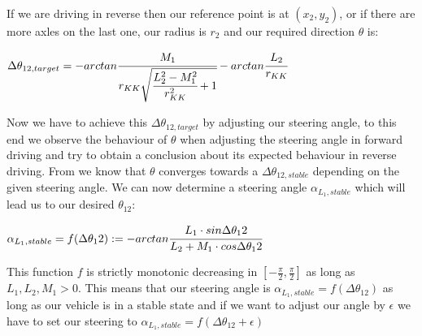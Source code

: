 If we are driving in reverse then our reference point is at $(x_2,y_2)$, or if there are more axles on the last one, our radius is $r_2$ and our required direction $\theta$ is:

\begin{center}
$\Delta \theta_{12,target}=-arctan \cfrac{M_1}{r_{KK} \sqrt{\cfrac{L_2^2-M^2_1}{r^2_{KK}}+1}}-arctan \cfrac{L_2}{r_{KK}}$
\end{center}

Now we have to achieve this $\Delta \theta_{12,target}$ by adjusting our steering angle, to this end we observe the behaviour of $\theta$ when adjusting the steering angle in forward driving and try to obtain a conclusion about its expected behaviour in reverse driving. From \cite{12} we know that $\theta$ converges towards a $\Delta \theta_{12,stable}$ depending on the given steering angle. We can now determine a steering angle $\alpha_{L_1,stable}$ which will lead us to our desired $\theta_12$:

\begin{center}
$\alpha_{L_1,stable}=f(\Delta \theta_12):=-arctan \cfrac{L_1 \cdot sin \Delta \theta_12}{L_2+M_1 \cdot cos \Delta \theta_12}$
\end{center}

This function $f$ is strictly monotonic decreasing in $\left[- \tfrac{\pi}{2},\tfrac{\pi}{2} \right]$ as long as $L_1, L_2, M_1 >0$. This means that our steering angle is $\alpha_{L_1,stable}=f(\Delta \theta_12)$ as long as our vehicle is in a stable state and if we want to adjust our angle by $\epsilon$ we have to set our steering to $\alpha_{L_1,stable}=f(\Delta \theta_12+\epsilon)$





